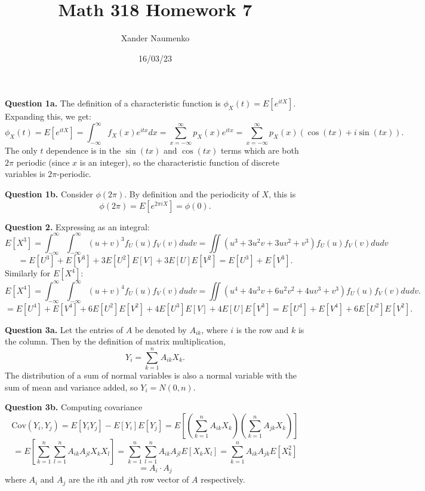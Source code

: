 \documentclass[letterpaper, reqno,11pt]{article}
\begin{document}
\title{Math 318 Homework 7}
\date{16/03/23}
\author{Xander Naumenko}
\maketitle

{\medskip\noindent\bf Question 1a.} The definition of a characteristic function is $\phi_{X}(t)=E[e^{itX}]$. Expanding this, we get: 
\[
\phi_{X}(t)=E[e^{itX}]=\int_{-\infty}^{\infty}f_X(x) e^{itx}dx=\sum_{x=-\infty}^{\infty}p_X(x) e^{itx}=\sum_{x=-\infty}^{\infty}p_X(x) \left( \cos(tx)+i\sin(tx) \right) 
.\]
The only $t$ dependence is in the $\sin(tx)$ and $\cos(tx)$ terms which are both $2\pi$ periodic (since $x$ is an integer), so the characteristic function of discrete variables is $2\pi$-periodic. 



{\medskip\noindent\bf Question 1b.} Consider $\phi(2\pi)$. By definition and the periodicity of $X$, this is
\[
    \phi(2\pi)=E[e^{2\pi iX}]=\phi(0)
.\]

{\medskip\noindent\bf Question 2.} Expressing as an integral: 
\[
    E[X^3]=\int_{-\infty}^{\infty}\int_{-\infty}^{\infty}(u+v)^3f_U(u)f_V(v)dudv=\iint (u^3+3u^2v+3uv^2+v^3)f_U(u)f_V(v)dudv
\]
\[
    =E[U^3]+E[V^3]+3E[U^2]E[V]+3E[U]E[V^2]=E[U^3]+E[V^3]
.\]
Similarly for $E[X^{4}]$: 
\[
    E[X^4]=\int_{-\infty}^{\infty}\int_{-\infty}^{\infty}(u+v)^4f_U(u)f_V(v)dudv=\iint (u^4+4u^3v+6u^2v^2+4uv^3+v^3)f_U(u)f_V(v)dudv
.\]
\[
    =E[U^4]+E[V^4]+6E[U^2]E[V^2]+4E[U^3]E[V]+4E[U]E[V^3]=E[U^4]+E[V^4]+6E[U^2]E[V^2]
.\]

{\medskip\noindent\bf Question 3a.} Let the entries of $A$ be denoted by $A_{ik}$, where $i$ is the row and $k$ is the column. Then by the definition of matrix multiplication,
\[
    Y_i=\sum_{k=1}^{n}A_{ik}X_k
.\]
The distribution of a sum of normal variables is also a normal variable with the sum of mean and variance added, so $Y_i=N(0,n)$. 

{\medskip\noindent\bf Question 3b.} Computing covariance
\[
    \text{Cov}(Y_i,Y_j)=E[Y_iY_j]-E[Y_i]E[Y_j]=E\left[\left(\sum_{k=1}^{n}A_{ik}X_k\right)\left( \sum_{k=1}^{n}A_{jk}X_k \right) \right]
\]
\[
    =E\left[\sum_{k=1}^{n}\sum_{l=1}^{n}A_{ik}A_{jl}X_kX_l\right]=\sum_{k=1}^{n}\sum_{l=1}^{n}A_{ik}A_{jl}E[X_kX_l]=\sum_{k=1}^{n}A_{ik}A_{jk}E[X_k^2]
\]
\[
=A_i\cdot A_j
\]
where $A_i$ and $A_j$ are the $i$th and $j$th row vector of $A$ respectively.
\end{document}

